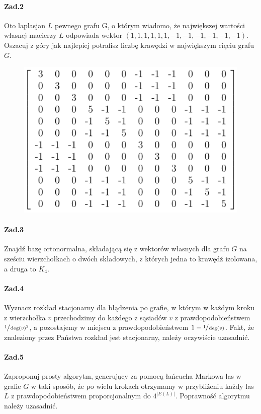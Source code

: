 \documentclass[a4paper,12pt]{article}
\theoremstyle{definition}%
\theoremstyle{definition}
\theoremstyle{problem}
\begin{document}
\paragraph{Zad.2} Oto laplasjan $L$ pewnego grafu G, o którym wiadomo, że największej wartości własnej macierzy $L$ odpowiada wektor $(1, 1, 1, 1, 1, 1, -1, -1, -1, -1, -1, -1)$. Oszacuj z góry jak najlepiej potrafisz liczbę krawędzi w największym cięciu grafu $G$.

\begin{figure}[H]
\centering
\includegraphics[width=.6\textwidth]{img/ROZ_2_2}
\end{figure}

\paragraph{Zad.3} Znajdź bazę ortonormalna, składającą się z wektorów własnych dla grafu $G$ na sześciu wierzchołkach o dwóch składowych, z których jedna to krawędź izolowana, a druga to $K_4$.

\paragraph{Zad.4} Wyznacz rozkład stacjonarny dla błądzenia po grafie, w którym w każdym kroku z wierzchołka $v$ przechodzimy do każdego z sąsiadów $v$ z prawdopodobieństwem $\sfrac{1}{\deg  (v)^2}$, a pozostajemy w miejscu z prawdopodobieństwem $1 - \sfrac{1}{\deg (v)}$. Fakt, że znaleziony przez Państwa rozkład jest stacjonarny, należy oczywiście uzasadnić.

\paragraph{Zad.5} Zaproponuj prosty algorytm, generujący za pomocą łańcucha Markowa las w grafie $G$ w taki sposób, że po wielu krokach otrzymamy w przybliżeniu każdy las $L$ z prawdopodobieństwem proporcjonalnym do $4^{|E(L)|}$. Poprawność algorytmu należy uzasadnić.
\end{document}
